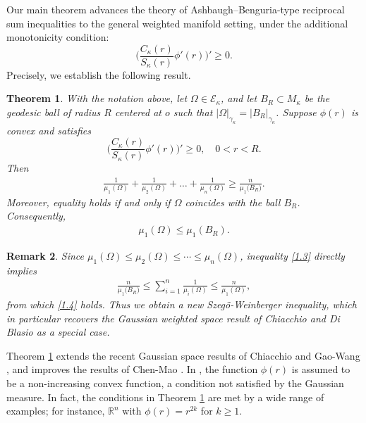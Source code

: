 \documentclass[11pt,leqno]{amsart}
\newtheorem{theorem}{Theorem}[section]\newtheorem{thm}[theorem]{Theorem}
\newtheorem{remark}[theorem]{Remark}
\def\k{\kappa}
\def\R{\mathbb{R}}
\def\k{\kappa}
\numberwithin{equation}{section}
\begin{document}
Our main theorem advances the theory of Ashbaugh–Benguria-type reciprocal sum inequalities to the general weighted manifold setting, under the additional monotonicity condition: $$\big(\frac{C_{\k}(r)}{S_{\k}(r)}\phi'(r)\big)'\ge0.$$
Precisely, we establish the following result.
\begin{theorem}\label{thm1.1}
With the notation above, let  $\Omega\in \mathcal{E}_\k$, and  let $B_R\subset M_\k$ be the geodesic ball of radius $R$ centered at  $o$ such that $|\Omega|_{\gamma_\k}=|B_R|_{\gamma_\k}$. Suppose $\phi(r)$ is convex and satisfies 
$$ \big(\frac{C_{\k}(r)}{S_{\k}(r)}\phi'(r)\big)'\geq 0, \quad 0<r<R.$$
 Then 
 \begin{align}\label{1.3}
\frac{1}{\mu_{1}(\Omega)} + \frac{1}{\mu_{2}(\Omega)} + \dots + \frac{1}{\mu_{n}(\Omega)} \ge \frac{n}{\mu_{1}\big(B_R\big)}.
\end{align}
Moreover, equality holds if and only if $\Omega$ coincides with the ball $B_R$. Consequently,
\begin{align}\label{1.4}
    \mu_1(\Omega)\le \mu_1(B_R).
\end{align}
\end{theorem}

\begin{remark}
    Since $\mu_1(\Omega)\le\mu_2(\Omega)\le\cdots\le \mu_n(\Omega)$, inequality \eqref{1.3} directly implies
    \begin{align*}
    \frac{n}{\mu_{1}\big(B_R\big)}\le    \sum_{i=1}^n \frac{1}{\mu_{i}(\Omega)}\le \frac{n}{\mu_{1}(\Omega)}, 
    \end{align*}
  from  which \eqref{1.4} holds. Thus we obtain a new Szeg\"o-Weinberger inequality, which in particular recovers the Gaussian weighted space result of Chiacchio and Di Blasio \cite{CB12} as a special case.
\end{remark}


Theorem \ref{thm1.1} extends the recent Gaussian space results of  Chiacchio \cite{Fr26} and Gao-Wang \cite{GW26}, and improves the results of Chen-Mao \cite{CM24}. In \cite{CM24}, the function $\phi(r)$ is assumed to be a non-increasing convex function, a condition not satisfied by the Gaussian measure. In fact, the conditions in Theorem \ref{thm1.1} are  met by a wide range of examples; for instance, $\R^{n}$ with $\phi(r)=r^{2k}$ for $k\ge 1$. 
\end{document}
